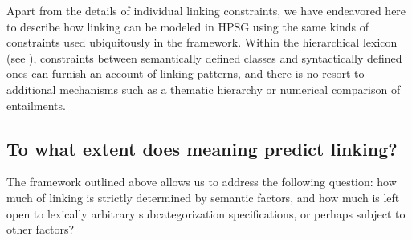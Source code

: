 \documentclass[output=paper
 	        ,biblatex
                ,babelshorthands
                ,newtxmath
                ,draftmode
                ,colorlinks, citecolor=brown
]{langscibook}
\begin{document}
\begin{exe}\ex\label{with-linking}
\end{exe} 


Apart from the details of individual linking constraints, we have endeavored here to describe how
linking can be modeled in HPSG using the same kinds of constraints used ubiquitously in the
framework.  Within the hierarchical lexicon (see ), constraints between
semantically defined classes and syntactically defined ones can furnish an account of linking
patterns, and there is no resort to additional mechanisms such as a thematic hierarchy or numerical comparison of entailments.%
%


\subsection{To what extent does meaning predict linking?}

The framework outlined above allows us to address the following question: how much of linking is strictly determined by semantic factors, and how much is left open to 
lexically arbitrary subcategorization specifications, or perhaps subject to other factors?
\end{document}
